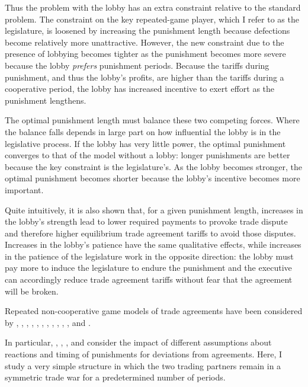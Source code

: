 \documentclass[authoryear, review]{elsarticle}
\begin{document}
Thus the problem with the lobby has an extra constraint relative to the standard problem. The constraint on the key repeated-game player, which I refer to as the legislature, is loosened by increasing the punishment length because defections become relatively more unattractive. However, the new constraint due to the presence of lobbying becomes tighter as the punishment becomes more severe because the lobby \textit{prefers} punishment periods. Because the tariffs during punishment, and thus the lobby's profits, are higher than the tariffs during a cooperative period, the lobby has increased incentive to exert effort as the punishment lengthens.

The optimal punishment length must balance these two competing forces. Where the balance falls depends in large part on how influential the lobby is in the legislative process. If the lobby has very little power, the optimal punishment converges to that of the model without a lobby: longer punishments are better because the key constraint is the legislature's. As the lobby becomes stronger, the optimal punishment becomes shorter because the lobby's incentive becomes more important.

Quite intuitively, it is also shown that, for a given punishment length, increases in the lobby's strength lead to lower required payments to provoke trade dispute and therefore higher equilibrium trade agreement tariffs to avoid those disputes. Increases in the lobby's patience have the same qualitative effects, while increases in the patience of the legislature work in the opposite direction: the lobby must pay more to induce the legislature to endure the punishment and the executive can accordingly reduce trade agreement tariffs without fear that the agreement will be broken.

Repeated non-cooperative game models of trade agreements have been considered by \citet{mcm86,mcm89}, \citet{cotmitch}, \citet{dixit1987}, \citet{bs1990, bs1997a, bs1997b, bs2002}, \citet{kovthurs}, \citet{maggi99}, \citet{ederington}, \citet{ludema2001}, \citet{rosendorff}, \citet{krw}, \citet{bagwell2009}, and \citet{park}.

In particular, \citet{hungerford}, \citet{riezman1991}, \citet{cotmitch}, \citet{bagwell2008} and \citet{martinvergote} consider the impact of different assumptions about reactions and timing of punishments for deviations from agreements. Here, I study a very simple structure in which the two trading partners remain in a symmetric trade war for a predetermined number of periods.
\end{document}

